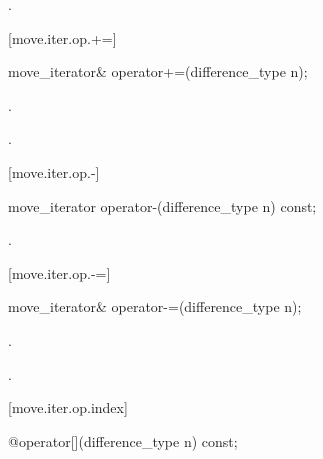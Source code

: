 \begin{itemdescr}
\pnum
\returns {}.
\end{itemdescr}

[move.iter.op.+=]{}

%
%
\begin{itemdecl}
move_iterator& operator+=(difference_type n);
\end{itemdecl}

\begin{itemdescr}
\pnum
\effects {}.

\pnum
\returns {}.
\end{itemdescr}

[move.iter.op.-]{}

%
%
\begin{itemdecl}
move_iterator operator-(difference_type n) const;
\end{itemdecl}

\begin{itemdescr}
\pnum
\returns {}.
\end{itemdescr}

[move.iter.op.-=]{}

%
%
\begin{itemdecl}
move_iterator& operator-=(difference_type n);
\end{itemdecl}

\begin{itemdescr}
\pnum
\effects {}.

\pnum
\returns {}.
\end{itemdescr}

[move.iter.op.index]{}

%
%
\begin{itemdecl}
@\unspec@ operator[](difference_type n) const;
\end{itemdecl}

